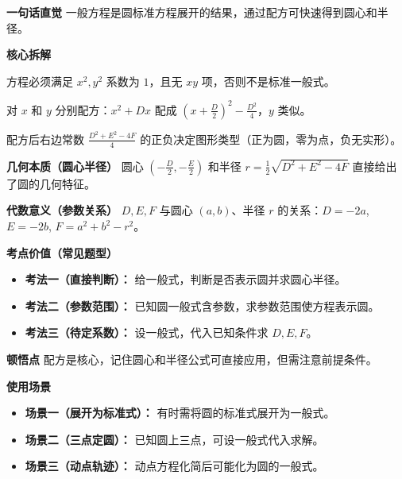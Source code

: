 \begin{explanationbox}
	\textbf{\textcolor{CExplanation}{一句话直觉}}
	一般方程是圆标准方程展开的结果，通过配方可快速得到圆心和半径。

	\medskip
	\textbf{\textcolor{CExplanation}{核心拆解}}
	\begin{description}[style=nextline, leftmargin=2.8em, labelsep=0.5em, itemsep=0.45em]
		\item[\textbf{要点一（配方前提）：}]
			方程必须满足 $x^2,y^2$ 系数为 $1$，且无 $xy$ 项，否则不是标准一般式。
		\item[\textbf{要点二（配方操作）：}]
			对 $x$ 和 $y$ 分别配方：$x^2+Dx$ 配成 $(x+\frac{D}{2})^2-\frac{D^2}{4}$，$y$ 类似。
		\item[\textbf{要点三（符号判定）：}]
			配方后右边常数 $\frac{D^2+E^2-4F}{4}$ 的正负决定图形类型（正为圆，零为点，负无实形）。
	\end{description}

	\medskip
	\textbf{\textcolor{CExplanation}{几何本质（圆心半径）}}
	圆心 $(-\frac{D}{2},-\frac{E}{2})$ 和半径 $r=\frac12\sqrt{D^2+E^2-4F}$ 直接给出了圆的几何特征。

	\medskip
	\textbf{\textcolor{CExplanation}{代数意义（参数关系）}}
	$D,E,F$ 与圆心 $(a,b)$、半径 $r$ 的关系：$D=-2a$, $E=-2b$, $F=a^2+b^2-r^2$。

	\medskip
	\textbf{\textcolor{CExplanation}{考点价值（常见题型）}}
	\begin{itemize}[leftmargin=*, itemsep=0.5em, topsep=0.4em]
		\item \textbf{考法一（直接判断）：} 给一般式，判断是否表示圆并求圆心半径。
		\item \textbf{考法二（参数范围）：} 已知圆一般式含参数，求参数范围使方程表示圆。
		\item \textbf{考法三（待定系数）：} 设一般式，代入已知条件求 $D,E,F$。
	\end{itemize}

	\medskip
	\textbf{\textcolor{CExplanation}{顿悟点}}
	配方是核心，记住圆心和半径公式可直接应用，但需注意前提条件。

	\medskip
	\textbf{\textcolor{CExplanation}{使用场景}}
	\begin{itemize}[leftmargin=*, itemsep=0.5em, topsep=0.4em]
		\item \textbf{场景一（展开为标准式）：} 有时需将圆的标准式展开为一般式。
		\item \textbf{场景二（三点定圆）：} 已知圆上三点，可设一般式代入求解。
		\item \textbf{场景三（动点轨迹）：} 动点方程化简后可能化为圆的一般式。
	\end{itemize}

\end{explanationbox}
